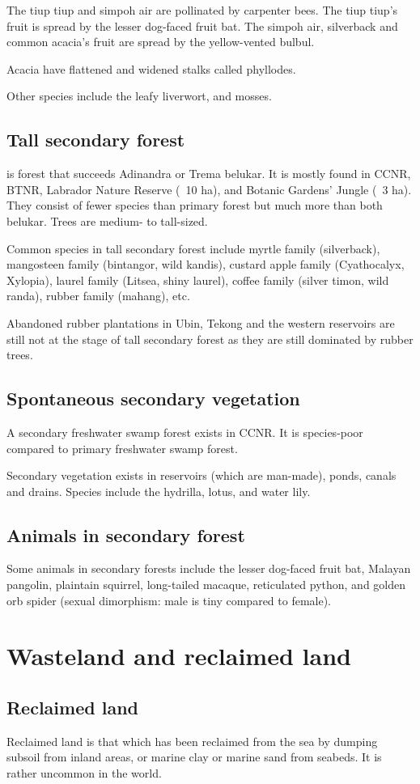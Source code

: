 \documentclass{slnotes}
\begin{document}
The tiup tiup and simpoh air are pollinated by carpenter bees. The tiup tiup's fruit is spread by the lesser dog-faced fruit bat. The simpoh air, silverback and common acacia's fruit are spread by the yellow-vented bulbul.

Acacia have flattened and widened stalks called phyllodes.

Other species include the leafy liverwort, and mosses.
\section{Tall secondary forest}
 is forest that succeeds Adinandra or Trema belukar. It is mostly found in CCNR, BTNR, Labrador Nature Reserve (~10 ha), and Botanic Gardens' Jungle (~3 ha). They consist of fewer species than primary forest but much more than both belukar. Trees are medium- to tall-sized.

Common species in tall secondary forest include myrtle family (silverback), mangosteen family (bintangor, wild kandis), custard apple family (Cyathocalyx, Xylopia), laurel family (Litsea, shiny laurel), coffee family (silver timon, wild randa), rubber family (mahang), etc.

Abandoned rubber plantations in Ubin, Tekong and the western reservoirs are still not at the stage of tall secondary forest as they are still dominated by rubber trees.
\section{Spontaneous secondary vegetation}
A secondary freshwater swamp forest exists in CCNR. It is species-poor compared to primary freshwater swamp forest.

Secondary vegetation exists in reservoirs (which are man-made), ponds, canals and drains. Species include the hydrilla, lotus, and water lily.
\section{Animals in secondary forest}
Some animals in secondary forests include the lesser dog-faced fruit bat, Malayan pangolin, plaintain squirrel, long-tailed macaque, reticulated python, and golden orb spider (sexual dimorphism: male is tiny compared to female).
\chapter{Wasteland and reclaimed land}
\section{Reclaimed land}
Reclaimed land is that which has been reclaimed from the sea by dumping subsoil from inland areas, or marine clay or marine sand from seabeds. It is rather uncommon in the world.
\end{document}
